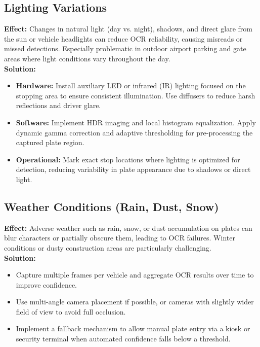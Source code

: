 	\subsection{Lighting Variations}
	\textbf{Effect:} Changes in natural light (day vs. night), shadows, and direct glare from the sun or vehicle headlights can reduce OCR reliability, causing misreads or missed detections. Especially problematic in outdoor airport parking and gate areas where light conditions vary throughout the day. \\
	\textbf{Solution:} 
	\begin{itemize}
		\item \textbf{Hardware:} Install auxiliary LED or infrared (IR) lighting focused on the stopping area to ensure consistent illumination. Use diffusers to reduce harsh reflections and driver glare.
		\item \textbf{Software:} Implement HDR imaging and local histogram equalization. Apply dynamic gamma correction and adaptive thresholding for pre-processing the captured plate region.
		\item \textbf{Operational:} Mark exact stop locations where lighting is optimized for detection, reducing variability in plate appearance due to shadows or direct light.
	\end{itemize}
	
	\subsection{Weather Conditions (Rain, Dust, Snow)}
	\textbf{Effect:} Adverse weather such as rain, snow, or dust accumulation on plates can blur characters or partially obscure them, leading to OCR failures. Winter conditions or dusty construction areas are particularly challenging. \\
	\textbf{Solution:} 
	\begin{itemize}
		\item Capture multiple frames per vehicle and aggregate OCR results over time to improve confidence.
		\item Use multi-angle camera placement if possible, or cameras with slightly wider field of view to avoid full occlusion.
		\item Implement a fallback mechanism to allow manual plate entry via a kiosk or security terminal when automated confidence falls below a threshold.
	\end{itemize}
	
